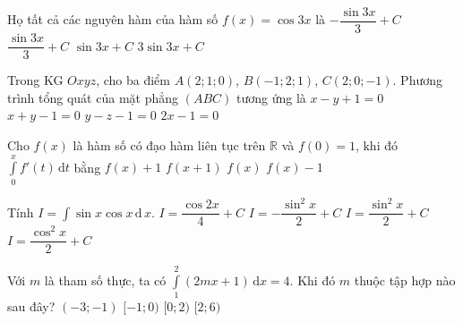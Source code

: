 \begin{ex}%
Họ tất cả các nguyên hàm của hàm số $f(x)=\cos 3x$ là
\choice
{$-\dfrac{\sin 3x}{3}+C$}
{\True $\dfrac{\sin 3x}{3}+C$}
{$\sin 3x+C$}
{$3 \sin 3x+C$}
\end{ex}

\begin{ex}%
Trong KG $Oxyz$, cho ba điểm $A(2;1;0)$, $B(-1;2;1)$, $C(2;0;-1)$. Phương trình tổng quát của mặt phẳng $(A B C)$ tương ứng là
\choice
{$x-y+1=0$}
{$x+y-1=0$}
{\True $y-z-1=0$}
{$2x-1=0$}
\end{ex}

\begin{ex}%
Cho $f(x)$ là hàm số có đạo hàm liên tục trên $\mathbb{R}$ và $f(0)=1$, khi đó $\displaystyle\int\limits_0^x f'(t)\mathrm{\,d}t$ bằng
\choice
{$f(x)+1$}
{$f(x+1)$}
{$f(x)$}
{\True $f(x)-1$}
\end{ex}

\begin{ex}%
Tính $ I = \displaystyle  \int \sin x \cos x\, \mathrm{d\,} x $.
\choice
{$ I =  \dfrac{\cos 2x}{4} + C $}
{$ I =  - \dfrac{\sin^2 x }{2} + C $}
{\True $ I =  \dfrac{\sin^2 x}{2} + C $}
{$ I =  \dfrac{\cos^2 x}{2} + C $}
\end{ex}

\begin{ex}%
Với $ m $ là tham số thực, ta có $ \displaystyle\int\limits_{1}^{2} (2mx+1)\mathrm{\,d}x =4$. Khi đó $ m $ thuộc tập hợp nào sau đây?
\choice
{$ (-3;-1) $}
{$ [-1;0) $}
{\True $ [0;2) $}
{$ [2;6) $}
\loigiai{
Ta có
\allowdisplaybreaks
\begin{eqnarray*}
&&\displaystyle\int\limits_{1}^{2} (2mx+1)\mathrm{\,d}x =4\\
&\Leftrightarrow&(mx^2+x)\bigg|^{2}_{1}=4\\
&\Leftrightarrow&4m+2-(m+1)=4\\
&\Leftrightarrow&m=1\in[0;2).
\end{eqnarray*}
}
\end{ex}

